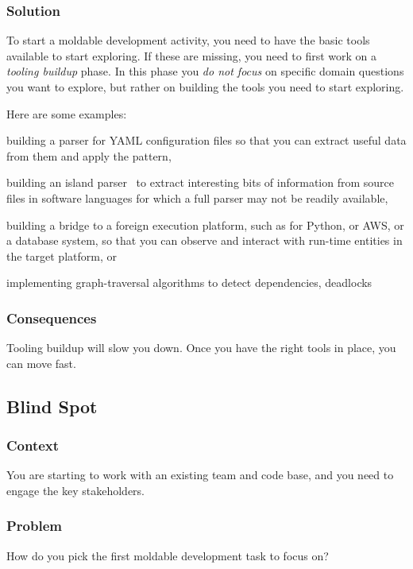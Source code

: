 \documentclass[sigconf]{acmart}
\newcommand{\pattern}[1]{\emph{\nameref{pat:#1}}\xspace}
\begin{document}
\subsubsection*{Solution}
To start a moldable development activity, you need to have the basic tools available to start exploring.
If these are missing, you need to first work on a \emph{tooling buildup} phase.
In this phase you \emph{do not focus} on specific domain questions you want to explore, but rather on building the tools you need to start exploring.

Here are some examples:
\begin{inparaenum}[(i)]
\item building a parser for YAML configuration files so that you can extract useful data from them and apply the \pattern{moldableDataWrapper} pattern,
\item building an island parser~\cite{Kurs14b} to extract interesting bits of information from source files in software languages for which a full parser may not be readily available,
\item building a bridge to a foreign execution platform, such as for Python, or AWS, or a database system, so that you can observe and interact with run-time entities in the target platform, or
\item implementing graph-traversal algorithms to detect dependencies, deadlocks \etc
\end{inparaenum}

\subsubsection*{Consequences}
Tooling buildup will slow you down.
Once you have the right tools in place, you can move fast.

\subsection*{Blind Spot}\label{pat:blindSpot}
\subsubsection*{Context}
You are starting to work with an existing team and code base, and you need to engage the key stakeholders.

\subsubsection*{Problem}
How do you pick the first moldable development task to focus on?
\end{document}
